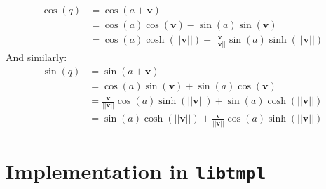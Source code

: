 \documentclass{article}
\begin{document}
            \begin{subequations}
                \begin{align}
                    \cos(q)
                    &=\cos(a+\mathbf{v})\\
                    &=\cos(a)\cos(\mathbf{v})-\sin(a)\sin(\mathbf{v})\\
                    &=\cos(a)\cosh(||\mathbf{v}||)
                        -\frac{\mathbf{v}}{||\mathbf{v}||}
                        \sin(a)\sinh(||\mathbf{v}||)
                \end{align}
            \end{subequations}
            And similarly:
            \begin{subequations}
                \begin{align}
                    \sin(q)
                    &=\sin(a+\mathbf{v})\\
                    &=\cos(a)\sin(\mathbf{v})+\sin(a)\cos(\mathbf{v})\\
                    &=\frac{\mathbf{v}}{||\mathbf{v}||}
                        \cos(a)\sinh(||\mathbf{v}||)
                        +\sin(a)\cosh(||\mathbf{v}||)\\
                    &=\sin(a)\cosh(||\mathbf{v}||)+
                        \frac{\mathbf{v}}{||\mathbf{v}||}
                        \cos(a)\sinh(||\mathbf{v}||)
                \end{align}
            \end{subequations}
    \section{Implementation in \texttt{libtmpl}}
    \newpage
    
    
\end{document}

